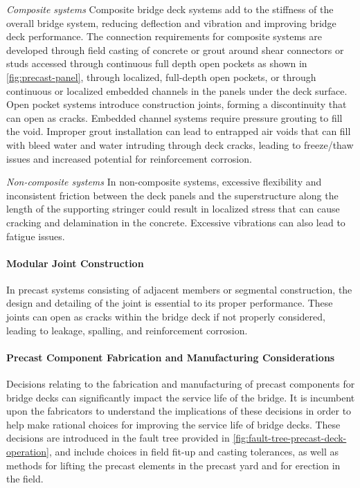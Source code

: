 \emph{Composite systems} Composite bridge deck systems add to the stiffness of the overall bridge system, reducing deflection and vibration and improving bridge deck performance. The connection requirements for composite systems are developed through field casting of concrete or grout around shear connectors or studs accessed through continuous full depth open pockets as shown in \cref{fig:precast-panel}, through localized, full-depth open pockets, or through continuous or localized embedded channels in the panels under the deck surface. Open pocket systems introduce construction joints, forming a discontinuity that can open as cracks. Embedded channel systems require pressure grouting to fill the void. Improper grout installation can lead to entrapped air voids that can fill with bleed water and water intruding through deck cracks, leading to freeze/thaw issues and increased potential for reinforcement corrosion.

\emph{Non-composite systems}
In non-composite systems, excessive flexibility and inconsistent friction between the deck
panels and the superstructure along the length of the supporting stringer could result in localized stress that can cause
cracking and delamination in the concrete. Excessive vibrations can also lead to fatigue issues.

\paragraph{Modular Joint Construction}
In precast systems consisting of adjacent members or segmental construction, the design and detailing of the joint
is essential to its proper performance. These joints can open as cracks within the bridge deck if not properly
considered, leading to leakage, spalling, and reinforcement corrosion.


\paragraph{Precast Component Fabrication and Manufacturing Considerations}
Decisions relating to the fabrication and manufacturing of precast components for bridge decks can significantly impact the service life of the bridge. It is incumbent upon the fabricators to understand the implications of these decisions in order to help make rational choices for improving the service life of bridge decks. These decisions are introduced in the fault tree provided in \cref{fig:fault-tree-precast-deck-operation}, and include choices in field fit-up and casting tolerances, as well as methods for lifting the precast elements in the precast yard and for erection in the field.

